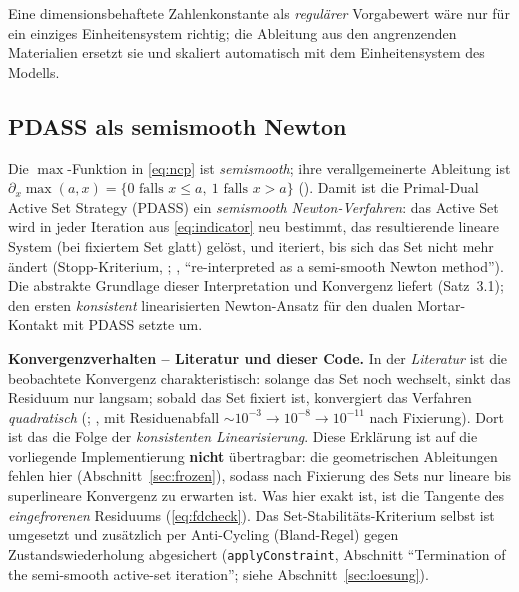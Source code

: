 \documentclass[a4paper,11pt]{article}
\newcommand{\code}[1]{\texttt{\small #1}}
\begin{document}
\noindent Eine dimensionsbehaftete Zahlenkonstante als \emph{regulärer} Vorgabewert wäre nur für
ein einziges Einheitensystem richtig; die Ableitung aus den angrenzenden Materialien ersetzt sie und
skaliert automatisch mit dem Einheitensystem des Modells.

\subsection{PDASS als semismooth Newton}
Die $\max$-Funktion in \eqref{eq:ncp} ist \emph{semismooth}; ihre verallgemeinerte Ableitung ist
$\partial_x\max(a,x)=\{0 \text{ falls } x\le a,\ 1 \text{ falls } x>a\}$ (\citealp[Gl.~(64)]{gitterle}).
Damit ist die Primal-Dual Active Set Strategy (PDASS) ein \emph{semismooth Newton-Verfahren}: das
Active Set wird in jeder Iteration aus \eqref{eq:indicator} neu bestimmt, das resultierende lineare
System (bei fixiertem Set glatt) gelöst, und iteriert, bis sich das Set nicht mehr ändert
(Stopp-Kriterium, \citealp[S.~3153]{hueber2005}; \citealp[Abschn.~3.5.2]{farah}, ``re-interpreted as a
semi-smooth Newton method''). Die abstrakte Grundlage dieser Interpretation und Konvergenz liefert
\citet{hik2002} (Satz~3.1); den ersten \emph{konsistent} linearisierten
Newton-Ansatz für den dualen Mortar-Kontakt mit PDASS setzte \citet[Gl.~(65)/(67)]{poppgeewall2009} um.

\medskip
\noindent\textbf{Konvergenzverhalten -- Literatur und dieser Code.} In der \emph{Literatur} ist die
beobachtete Konvergenz charakteristisch: solange das Set noch wechselt, sinkt das Residuum nur
langsam; sobald das Set fixiert ist, konvergiert das Verfahren \emph{quadratisch}
(\citealp[S.~560]{gitterle}; \citealp[Tab.~4.1]{farah}, mit Residuenabfall
$\sim10^{-3}\!\to\!10^{-8}\!\to\!10^{-11}$ nach Fixierung). Dort ist das die Folge der
\emph{konsistenten Linearisierung}. Diese Erklärung ist auf die vorliegende Implementierung
\textbf{nicht} übertragbar: die geometrischen Ableitungen fehlen hier
(Abschnitt~\ref{sec:frozen}), sodass nach Fixierung des Sets nur lineare bis superlineare
Konvergenz zu erwarten ist. Was hier exakt ist, ist die Tangente des \emph{eingefrorenen}
Residuums (\eqref{eq:fdcheck}). Das Set-Stabilitäts-Kriterium selbst ist umgesetzt und
zusätzlich per Anti-Cycling (Bland-Regel) gegen Zustandswiederholung abgesichert
(\code{applyConstraint}, Abschnitt ``Termination of the semi-smooth active-set iteration'';
siehe Abschnitt~\ref{sec:loesung}).

\end{document}
